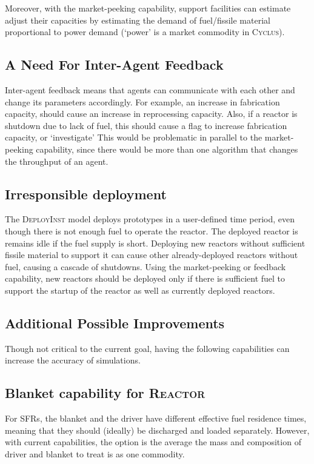 \documentclass{article}
\newcommand{\Cyclus}{\textsc{Cyclus}\xspace}%
\begin{document}
Moreover, with the market-peeking capability, support facilities can estimate adjust their
capacities by estimating
the demand of fuel/fissile material proportional to power demand (`power' is a market commodity in \Cyclus).

\subsection{A Need For Inter-Agent Feedback}
Inter-agent feedback means that agents can communicate with each other and change its parameters accordingly. 
For example, an increase in fabrication capacity, should cause an increase in reprocessing capacity. Also,
if a reactor is shutdown due to lack of fuel, this should cause a flag to increase fabrication capacity,
or `investigate'
This would be problematic in parallel to the market-peeking capability, since there would be more than one algorithm
that changes the throughput of an agent. 

\subsection{Irresponsible deployment}
The \textsc{DeployInst}\xspace model deploys prototypes in a user-defined time period, even though there is not 
enough fuel to operate the reactor. The deployed reactor is remains idle if the fuel supply is short. Deploying new reactors
without sufficient fissile material to support it can cause other already-deployed reactors without fuel, causing
a cascade of shutdowns. Using the market-peeking or feedback capability, new reactors should be deployed only
if there is sufficient fuel to support the startup of the reactor as well as currently deployed reactors. 


\subsection{Additional Possible Improvements}
Though not critical to the current goal, having the following capabilities can increase
the accuracy of simulations.


\subsection{Blanket capability for \textsc{Reactor}\xspace}
For \glspl{SFR}, the blanket and the driver have different effective fuel residence times, meaning that
they should (ideally) be discharged and loaded separately. However, with current capabilities, the option is the average
the mass and composition of driver and blanket to treat is as one commodity.
\end{document}
